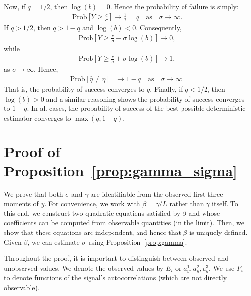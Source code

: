 \documentclass[9pt,twocolumn,twoside,lineno]{pnas-new}
\renewcommand{\P}{\mathrm{Prob}}
\begin{document}
%
Now, if $q = 1/2$, then $\log(b) = 0$. Hence the probability of failure is simply:
%
\begin{align*}
%
\P\left[Y \ge \frac{c}{\sigma} \right] \longrightarrow \frac{1}{2} = q
\quad \text{as} \quad \sigma \to \infty.
%
\end{align*}
If $q > 1/2$, then $q > 1-q$ and $\log(b) < 0$. Consequently, 
%
\begin{align*}
%
\P\left[Y \ge \frac{c}{\sigma} - \sigma \log(b) \right] \longrightarrow 0,
%
\end{align*}
%
while
%
\begin{align*}
%
\P\left[Y \ge \frac{c}{\sigma} + \sigma \log(b) \right] \longrightarrow 1,
%
\end{align*}
%
as $\sigma \to \infty$. Hence,
%
\begin{align*}
%
\P[\hat{\eta} \ne \eta]
& \longrightarrow 1-q  \quad \text{as} \quad  \sigma \to \infty.
%
\end{align*}
That is, the probability of success converges to $q$.
Finally, if $q < 1/2$, then $\log(b) > 0$ and a similar reasoning shows the probability of success converges to $1-q$.
In all cases, the probability of success of the best possible deterministic estimator converges to $\max(q, 1-q)$.

\section{Proof of Proposition~\ref{prop:gamma_sigma}} \label{sec:proof_prop_gamma_sigma}


We prove that both $\sigma$ and $\gamma$ are identifiable from the observed first three moments of $y$. For convenience, we work with $\beta = \gamma / L$ rather than $\gamma$ itself. To this end, we construct two quadratic equations satisfied by $\beta$ and whose coefficients can be computed from observable quantities (in the limit). Then, we show that these equations are independent, and hence that $\beta$ is uniquely defined. Given $\beta$, we can estimate $\sigma$ using Proposition~\ref{prop:gamma}.

Throughout the proof, it is important to distinguish between observed and unobserved values.
We denote the observed values by $E_i$ or $a_y^1,a_y^2,a_y^3$. We use $F_i$ to denote functions of the signal's autocorrelations (which are not directly observable).
\end{document}
